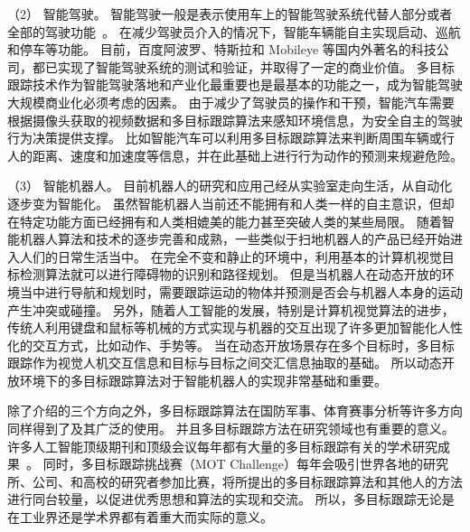 （2） 智能驾驶。
智能驾驶一般是表示使用车上的智能驾驶系统代替人部分或者全部的驾驶功能~\cite{bergmann2019tracking}。
在减少驾驶员介入的情况下，智能车辆能自主实现启动、巡航和停车等功能。
目前，百度阿波罗、特斯拉和 Mobileye 等国内外著名的科技公司，都已实现了智能驾驶系统的测试和验证，并取得了一定的商业价值。
多目标跟踪技术作为智能驾驶落地和产业化最重要也是最基本的功能之一，成为智能驾驶大规模商业化必须考虑的因素。
由于减少了驾驶员的操作和干预，智能汽车需要根据摄像头获取的视频数据和多目标跟踪算法来感知环境信息，为安全自主的驾驶行为决策提供支撑。
比如智能汽车可以利用多目标跟踪算法来判断周围车辆或行人的距离、速度和加速度等信息，并在此基础上进行行为动作的预测来规避危险。

（3）  智能机器人。
目前机器人的研究和应用己经从实验室走向生活，从自动化逐步变为智能化。
虽然智能机器人当前还不能拥有和人类一样的自主意识，但却在特定功能方面已经拥有和人类相媲美的能力甚至突破人类的某些局限。
随着智能机器人算法和技术的逐步完善和成熟，一些类似于扫地机器人的产品已经开始进入人们的日常生活当中。
在完全不变和静止的环境中，利用基本的计算机视觉目标检测算法就可以进行障碍物的识别和路径规划。
但是当机器人在动态开放的环境当中进行导航和规划时，需要跟踪运动的物体并预测是否会与机器人本身的运动产生冲突或碰撞。
另外，随着人工智能的发展，特别是计算机视觉算法的进步，传统人利用键盘和鼠标等机械的方式实现与机器的交互出现了许多更加智能化人性化的交互方式，比如动作、手势等。
当在动态开放场景存在多个目标时，多目标跟踪作为视觉人机交互信息和目标与目标之间交汇信息抽取的基础。
所以动态开放环境下的多目标跟踪算法对于智能机器人的实现非常基础和重要。


除了介绍的三个方向之外，多目标跟踪算法在国防军事、体育赛事分析等许多方向同样得到了及其广泛的使用。
并且多目标跟踪方法在研究领域也有重要的意义。
许多人工智能顶级期刊和顶级会议每年都有大量的多目标跟踪有关的学术研究成果~\cite{sun2021deep,xu2020how,young-chul2019online,zhang2019robust}。
同时，多目标跟踪挑战赛（MOT Challenge）每年会吸引世界各地的研究所、公司、和高校的研究者参加比赛，将所提出的多目标跟踪算法和其他人的方法进行同台较量，以促进优秀思想和算法的实现和交流。
所以，多目标跟踪无论是在工业界还是学术界都有着重大而实际的意义。


